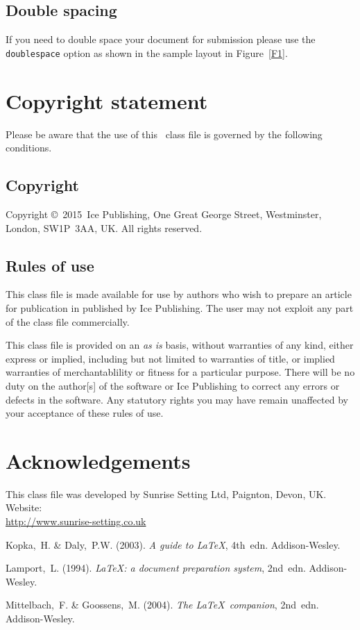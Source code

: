 \documentclass[times]{GeotechAuth}
\def\volumeyear{2015}
\begin{document}
\subsection{Double spacing}
If you need to double space your document for submission please
use the \verb+doublespace+ option as shown in the sample layout in
Figure~\ref{F1}.

\section{Copyright statement}
Please  be  aware that the use of  this \LaTeXe\ class file is
governed by the following conditions.

\subsection{Copyright}
Copyright \copyright\ \volumeyear\ Ice Publishing, One Great George Street, Westminster, London, SW1P~3AA, UK. All
rights reserved.

\subsection{Rules of use}
This class file is made available for use by authors who wish to
prepare an article for publication in \emph{\journalnamelc}
published by Ice Publishing. The user may not exploit any
part of the class file commercially.

This class file is provided on an \emph{as is}  basis, without
warranties of any kind, either express or implied, including but
not limited to warranties of title, or implied  warranties of
merchantablility or fitness for a particular purpose. There will
be no duty on the author[s] of the software or Ice Publishing
to correct any errors or defects in the software. Any
statutory  rights you may have remain unaffected by your
acceptance of these rules of use.

\section{Acknowledgements}
This class file was developed by Sunrise Setting Ltd,
Paignton, Devon, UK. Website:\\
\url{http://www.sunrise-setting.co.uk}

\begin{thebibliography}{99}
{Kopka,~H. \& Daly,~P.W.} (2003). \emph{A guide to \LaTeX}, 4th~edn.
Addison-Wesley.

{Lamport,~L.} (1994). \emph{\LaTeX: a document preparation system},
2nd~edn. Addison-Wesley.

{Mittelbach,~F. \& Goossens,~M.} (2004). \emph{The \LaTeX\ companion},
2nd~edn. Addison-Wesley.

\end{thebibliography}
\end{document}
